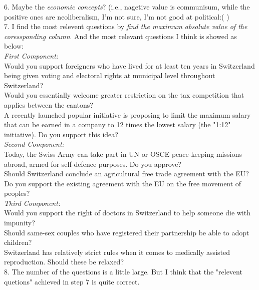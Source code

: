 \documentclass[11pt]{article} %
\begin{document}
6.  Maybe the \emph{economic concepts}? (i.e., nagetive value is communisum, while the positive ones are neoliberalism, I'm not sure, I'm not good at political:( )\\
7.  I find the most relevent questions by \emph{find the maximum absolute value of the coressponding column}. And the most relevant questions I think is showed as below:\\
\emph{First Component:}\\
Would you support foreigners who have lived for at least ten years in Switzerland being given voting and electoral rights at municipal level throughout Switzerland?\\
Would you essentially welcome greater restriction on the tax competition that applies between the cantons?\\
A recently launched popular initiative is proposing to limit the maximum salary that can be earned in a company to 12 times the lowest salary (the "1:12" initiative). Do you support this idea?\\
\emph{Second Component:}\\
Today, the Swiss Army can take part in UN or OSCE peace-keeping missions abroad, armed for self-defence purposes. Do you approve?\\
Should Switzerland conclude an agricultural free trade agreement with the EU?\\
Do you support the existing agreement with the EU on the free movement of peoples?\\
\emph{Third Component:}\\
Would you support the right of doctors in Switzerland to help someone die with impunity?\\
Should same-sex couples who have registered their partnership be able to adopt children?\\
Switzerland has relatively strict rules when it comes to medically assisted reproduction. Should these be relaxed?\\
8. The number of the questions is a little large. But I think that the "relevent quetions" achieved in step 7 is quite correct. \\
\end{document}
